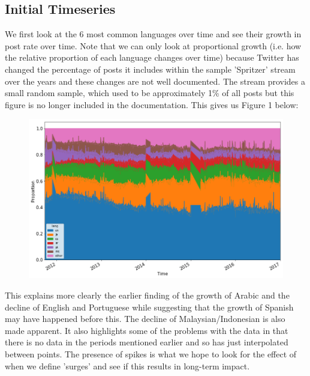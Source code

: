 \documentclass[12pt]{article}
\begin{document}
\subsection{Initial Timeseries}
We first look at the 6 most common languages over time and see their growth in post rate over time. Note that we can only look at proportional growth (i.e. how the relative proportion of each language changes over time) because Twitter has changed the percentage of posts it includes within the sample 'Spritzer' stream over the years and these changes are not well documented. The stream provides a small random sample, which used to be approximately 1\% of all posts but this figure is no longer included in the documentation. This gives us Figure 1 below:
\FloatBarrier
\begin{figure}[hbtp]\centering
\includegraphics[width=\textwidth,clip]{languageproportionplot.png}
\end{figure}
\FloatBarrier
This explains more clearly the earlier finding of the growth of Arabic and the decline of English and Portuguese while suggesting that the growth of Spanish may have happened before this. The decline of Malaysian/Indonesian is also made apparent. It also highlights some of the problems with the data in that there is no data in the periods mentioned earlier and so has just interpolated between points. The presence of spikes is what we hope to look for the effect of when we define 'surges' and see if this results in long-term impact.
\end{document}
